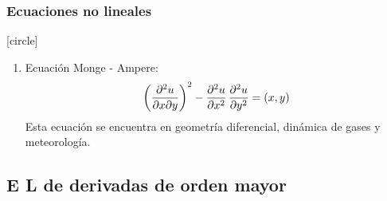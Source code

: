 \documentclass[12pt]{beamer}
\begin{document}
\begin{frame}
\frametitle{Ecuaciones no lineales}
[circle]
\begin{enumerate}[<+->]
\conti
\item Ecuación Monge - Ampere:
\pause
\begin{align}
\left( \pdv[2]{u}{x}{y} \right)^{2} - \pdv[2]{u}{x} \, \pdv[2]{u}{y} = (x, y)
\label{eq:ecuacion_S33}
\end{align}
Esta ecuación se encuentra en geometría diferencial, dinámica de gases y meteorología.
\end{enumerate}
\end{frame}

\subsection{E L de derivadas de orden mayor}
\end{document}
